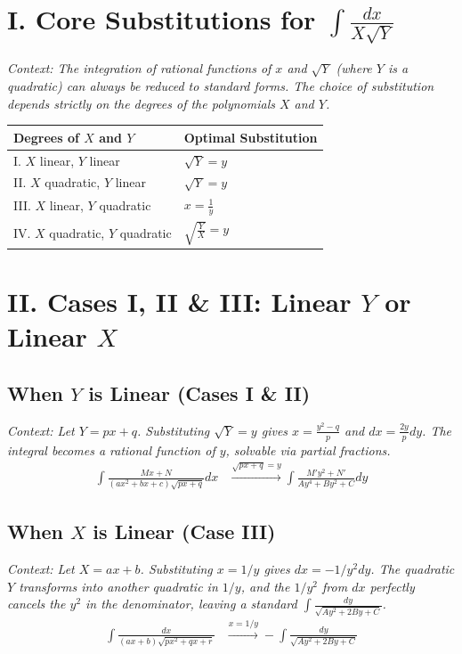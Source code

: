 \documentclass[11pt, a4paper]{article}
\begin{document}
\section*{\color{primary} I. Core Substitutions for $\int \frac{dx}{X\sqrt{Y}}$}

\textit{\small Context: The integration of rational functions of $x$ and $\sqrt{Y}$ (where $Y$ is a quadratic) can always be reduced to standard forms. The choice of substitution depends strictly on the degrees of the polynomials $X$ and $Y$.}

\begin{center}
\begin{tabular}{@{}p{} p{}@{}}
\toprule
\textbf{Degrees of $X$ and $Y$} & \textbf{Optimal Substitution} \\
\midrule
I. $X$ linear, $Y$ linear & $\sqrt{Y} = y$ \\
II. $X$ quadratic, $Y$ linear & $\sqrt{Y} = y$ \\
III. $X$ linear, $Y$ quadratic & $x = \frac{1}{y}$ \\
IV. $X$ quadratic, $Y$ quadratic & $\sqrt{\frac{Y}{X}} = y$ \\
\bottomrule
\end{tabular}
\end{center}

\vspace{0.3cm}

\section*{\color{primary} II. Cases I, II \& III: Linear $Y$ or Linear $X$}

\subsection*{\color{secondary} When $Y$ is Linear (Cases I \& II)}
\textit{\small Context: Let $Y = px+q$. Substituting $\sqrt{Y} = y$ gives $x = \frac{y^2-q}{p}$ and $dx = \frac{2y}{p}dy$. The integral becomes a rational function of $y$, solvable via partial fractions.}
\begin{align*}
    \int \frac{Mx+N}{(ax^2+bx+c)\sqrt{px+q}} dx &\xrightarrow{\sqrt{px+q}=y} \int \frac{M'y^2+N'}{Ay^4+By^2+C} dy
\end{align*}

\subsection*{\color{secondary} When $X$ is Linear (Case III)}
\textit{\small Context: Let $X = ax+b$. Substituting $x = 1/y$ gives $dx = -1/y^2 dy$. The quadratic $Y$ transforms into another quadratic in $1/y$, and the $1/y^2$ from $dx$ perfectly cancels the $y^2$ in the denominator, leaving a standard $\int \frac{dy}{\sqrt{Ay^2+2By+C}}$.}
\begin{align*}
    \int \frac{dx}{(ax+b)\sqrt{px^2+qx+r}} &\xrightarrow{x=1/y} -\int \frac{dy}{\sqrt{Ay^2+2By+C}}
\end{align*}
\end{document}
